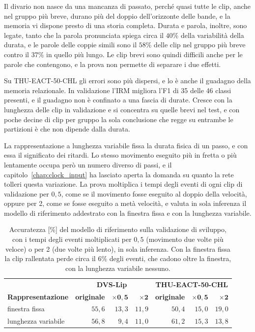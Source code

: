 Il divario non nasce da una mancanza di passato, perché quasi tutte le clip, anche nel gruppo più breve, durano più del doppio dell'orizzonte delle bande, e la memoria vi dispone presto di una storia completa. Durata e parola, inoltre, sono legate, tanto che la parola pronunciata spiega circa il $40\%$ della variabilità della durata, e le parole delle coppie simili sono il $58\%$ delle clip nel gruppo più breve contro il $37\%$ in quello più lungo. Le clip brevi sono quindi difficili anche per le parole che contengono, e la prova non permette di separare i due effetti.

Su THU-EACT-50-CHL gli errori sono più dispersi, e lo è anche il guadagno della memoria relazionale. In validazione l'IRM migliora l'F1 di 35 delle 46 classi presenti, e il guadagno non è confinato a una fascia di durate. Cresce con la lunghezza delle clip in validazione e si concentra su quelle brevi nel test, e con poche decine di clip per gruppo la sola conclusione che regge su entrambe le partizioni è che non dipende dalla durata.

\label{sec:ritmo}
La rappresentazione a lunghezza variabile fissa la durata fisica di un passo, e con essa il significato dei ritardi. Lo stesso movimento eseguito più in fretta o più lentamente occupa però un numero diverso di passi, e il capitolo~\ref{chap:clock_input} ha lasciato aperta la domanda su quanto la rete tolleri questa variazione. La prova moltiplica i tempi degli eventi di ogni clip di validazione per $0{,}5$, come se il movimento fosse eseguito al doppio della velocità, oppure per 2, come se fosse eseguito a metà velocità, e valuta in sola inferenza il modello di riferimento addestrato con la finestra fissa e con la lunghezza variabile.

\begin{table}[t]
\centering
\small
\renewcommand{\arraystretch}{1.2}
\caption[Accuratezza con i tempi degli eventi riscalati]{Accuratezza [\%] del modello di riferimento sulla validazione di sviluppo, con i tempi degli eventi moltiplicati per $0{,}5$ (movimento due volte più veloce) o per 2 (due volte più lento), in sola inferenza. Con la finestra fissa la clip rallentata perde circa il $6\%$ degli eventi, che cadono oltre la finestra, con la lunghezza variabile nessuno.}
\label{tab:ritmo}
\begin{tabular}{@{}l r r r r r r@{}}
\hline
 & \multicolumn{3}{c}{\textbf{DVS-Lip}} & \multicolumn{3}{c}{\textbf{THU-EACT-50-CHL}} \\
\textbf{Rappresentazione} & \textbf{originale} & $\boldsymbol{\times 0{,}5}$ & $\boldsymbol{\times 2}$ & \textbf{originale} & $\boldsymbol{\times 0{,}5}$ & $\boldsymbol{\times 2}$ \\
\hline
finestra fissa & $55{,}6$ & $13{,}3$ & $11{,}9$ & $50{,}4$ & $15{,}0$ & $19{,}0$ \\
lunghezza variabile & $56{,}8$ & $9{,}4$ & $11{,}0$ & $61{,}2$ & $15{,}3$ & $13{,}8$ \\
\hline
\end{tabular}
\end{table}

